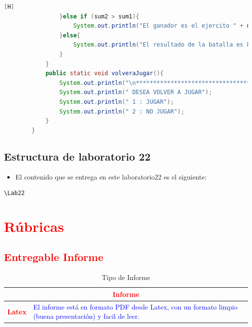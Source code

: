 \documentclass{article}
\begin{document}
\begin{lstlisting}[language=java,caption={Las lineas de codigos de la clase Mapa creada:}][H]
				}else if (sum2 > sum1){
					System.out.println("El ganador es el ejercito " + n2 + " de: " + kingdom2 +". Ya que al generar los porcentajes de probabilidad de victoria basada en los niveles de vida de sus soldados y aplicando un experimento aleatorio salio vencedor. (Aleatorio generado : "+ numero2 + ")");
				}else{
					System.out.println("El resultado de la batalla es Empate");
				}
			}
			public static void volveraJugar(){
				System.out.println("\n*********************************");
				System.out.println(" DESEA VOLVER A JUGAR");
				System.out.println(" 1 : JUGAR");
				System.out.println(" 2 : NO JUGAR");
			}
		}
	\end{lstlisting}
	\subsection{Estructura de laboratorio 22}
	\begin{itemize}	
		\item El contenido que se entrega en este laboratorio22 es el siguiente:
	\end{itemize}
	\begin{lstlisting}[style=ascii-tree]
	\Lab22
	\end{lstlisting}    
	\section{\textcolor{red}{Rúbricas}}
	
	\subsection{\textcolor{red}{Entregable Informe}}
	\begin{table}[H]
		\caption{Tipo de Informe}
		\setlength{\tabcolsep}{0.5em} %
		{\renewcommand{\arraystretch}{1.5}%
		\begin{tabular}{|p{3cm}|p{12cm}|}
			\hline
			\multicolumn{2}{|c|}{\textbf{\textcolor{red}{Informe}}}  \\
			\hline 
			\textbf{\textcolor{red}{Latex}} & \textcolor{blue}{El informe está en formato PDF desde Latex,  con un formato limpio (buena presentación) y facil de leer.}   \\ 
			\hline 
			
			
		\end{tabular}
	}
	\end{table}
	
	\clearpage
	
\end{document}
